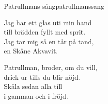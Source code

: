 \begin{song}{Patrullmans sång}{patrullmanssang}
\begin{vers}
Jag har ett glas uti min hand\\
till brädden fyllt med sprit.\\
Jag tar mig så en tår på tand,\\
en Skåne Akvavit.\\
\end{vers}
\begin{vers}
Patrullman, broder, om du vill,\\
drick ur tills du blir nöjd.\\
Skåla sedan alla till\\
i gamman och i fröjd.\\
\end{vers}
\end{song}
